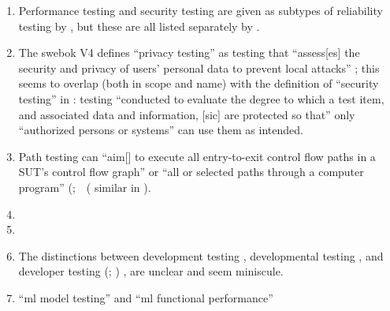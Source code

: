 \begin{enumerate}
    \item %
          Performance testing and security testing are given as subtypes of
          reliability testing by \citep{ISO_IEC2023a}, but these are all listed
          separately by \citep[p.~53]{Firesmith2015}.
    \item %
          The \acs{swebok} V4 defines ``privacy testing'' as testing that
          ``assess[es] the security and privacy of users' personal data to
          prevent local attacks'' \citep[p.~5-10]{SWEBOK2024}; this seems to
          overlap (both in scope and name) with the definition of ``security
          testing'' in \citep[p.~7]{IEEE2022}: testing
          ``conducted to evaluate the degree to which a test item, and
          associated data and information, [sic] are protected so that'' only
          ``authorized persons or systems'' can use them as intended.
    \item %
          \label{path-test-discrep}
          Path testing can ``aim[] to execute all entry-to-exit control flow
          paths in a SUT's control flow graph'' \citep[p.~5-13]{SWEBOK2024} or
          ``all or selected paths through a computer program''
          \ifnotpaper (\else \fi \citealp[p.~316]{IEEE2017}\ifnotpaper;\ \else\ (\fi%
          similar in \citealp[p.~119]{Patton2006}).
    \item %
          \tourDiscrep{}
    \item %
          \alphaDiscrep{}
    \item %
          The distinctions between development testing \citep[p.~136]{IEEE2017},
          developmental testing \citep[p.~30]{Firesmith2015}, and developer
          testing
          \ifnotpaper
              (\citealp[p.~39]{Firesmith2015}; \citealp[p.~11]{Gerrard2000a})
          \else
              \cite[p.~39]{Firesmith2015}, \cite[p.~11]{Gerrard2000a}
          \fi are unclear and seem miniscule.
    \item %
           \citetISTQB{} 
          ``\acf{ml} model testing'' and ``\acs{ml} functional performance''

\end{enumerate}
